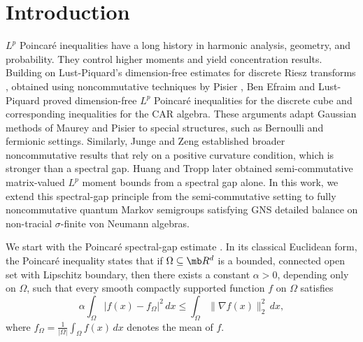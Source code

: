 \documentclass[sn-mathphys-num]{sn-jnl}
\begin{document}
\section{Introduction}\label{sec:intro}
$L^p$ Poincar\'e inequalities have a long history in harmonic analysis, geometry, and probability.
They control higher moments and yield concentration results.  Building on
Lust-Piquard's dimension-free estimates for discrete Riesz transforms
\cite{lustpiquard1998riesz,lustpiquard2004dimensionfree}, obtained
using noncommutative techniques by Pisier
\cite{pisier1988riesz}, Ben Efraim and
Lust-Piquard \cite{benefraim-lustpiquard2007} proved dimension-free $L^p$
Poincar\'e inequalities for the discrete cube and corresponding inequalities for
the CAR algebra.  These arguments adapt Gaussian methods of Maurey and Pisier to special structures, such as
Bernoulli and fermionic settings. Similarly, Junge and Zeng \cite{junge2015noncommutative} established broader noncommutative results that rely on a
positive curvature condition, which is stronger than a spectral gap. Huang and Tropp \cite{huang2021poincare} later obtained
semi-commutative matrix-valued $L^p$ moment bounds from a spectral gap alone.
In this work, we extend this spectral-gap principle from the semi-commutative setting to fully
noncommutative quantum Markov semigroups satisfying GNS detailed balance on
non-tracial $\sigma$-finite von Neumann algebras.

We start with the Poincar\'e spectral-gap estimate \cite{poincare1890}.
In its classical Euclidean form, the Poincar\'e inequality states that if
$\Omega\subseteq\mb R^d$ is a bounded, connected open set with Lipschitz boundary,
then there exists a constant $\alpha>0$, depending only on $\Omega$, such that every
smooth compactly supported function $f$ on $\Omega$ satisfies
\[\alpha\int_{\Omega}\bigl|f(x)-f_{\Omega}\bigr|^2\,dx
  \le \int_{\Omega}\|\nabla f(x)\|_2^2\,dx,\]
where $f_{\Omega}=\frac{1}{|\Omega|}\int_{\Omega}f(x)\,dx$ denotes the mean of $f$.
\end{document}

